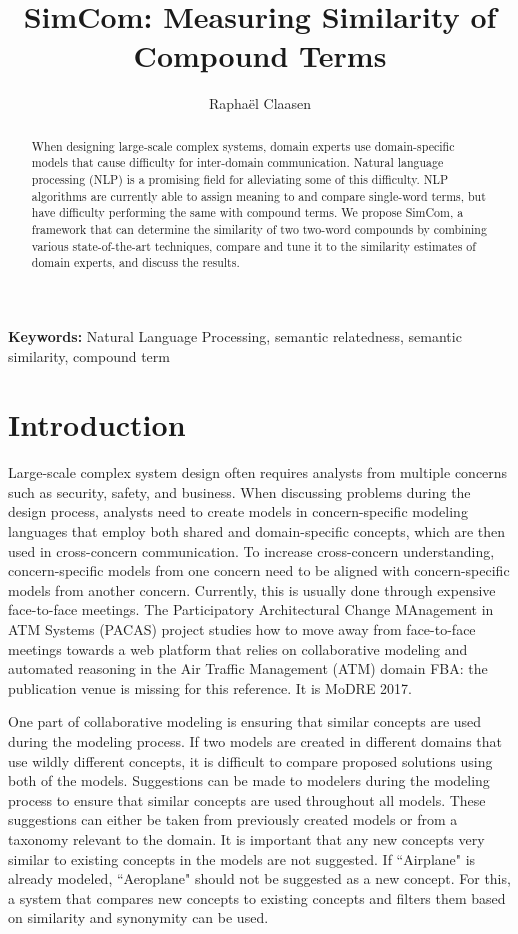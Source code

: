 \documentclass{article}
\title{SimCom: Measuring Similarity of Compound Terms}
\author{Rapha\"el Claasen}
\newcommand\fba[1]{\textcolor{SeaGreen3}{FBA: #1}}
\begin{document}
\maketitle

\begin{abstract}
When designing large-scale complex systems, domain experts use domain-specific models that cause difficulty for inter-domain communication. Natural language processing (NLP) is a promising field for alleviating some of this difficulty. NLP algorithms are currently able to assign meaning to and compare single-word terms, but have difficulty performing the same with compound terms. We propose SimCom, a framework that can determine the similarity of two two-word compounds by combining various state-of-the-art techniques, compare and tune it to the similarity estimates of domain experts, and discuss the results.
\end{abstract}

{\bf Keywords:} Natural Language Processing, semantic relatedness, semantic similarity, compound term

\section{Introduction} \label{sec:introduction}

Large-scale complex system design often requires analysts from multiple concerns such as security, safety, and business. When discussing problems during the design process, analysts need to create models in concern-specific modeling languages that employ both shared and domain-specific concepts, which are then used in cross-concern communication. To increase cross-concern understanding, concern-specific models from one concern need to be aligned with concern-specific models from another concern. Currently, this is usually done through expensive face-to-face meetings. The Participatory Architectural Change MAnagement in ATM Systems (PACAS) project studies how to move away from face-to-face meetings towards a web platform that relies on collaborative modeling and automated reasoning in the Air Traffic Management (ATM) domain \cite{aydemir2017towards} \fba{the publication venue is missing for this reference. It is MoDRE 2017}.

One part of collaborative modeling is ensuring that similar concepts are used during the modeling process. If two models are created in different domains that use wildly different concepts, it is difficult to compare proposed solutions using both of the models. Suggestions can be made to modelers during the modeling process to ensure that similar concepts are used throughout all models. These suggestions can either be taken from previously created models or from a taxonomy relevant to the domain. It is important that any new concepts very similar to existing concepts in the models are not suggested. If ``Airplane" is already modeled, ``Aeroplane" should not be suggested as a new concept. For this, a system that compares new concepts to existing concepts and filters them based on similarity and synonymity can be used.
\end{document}

